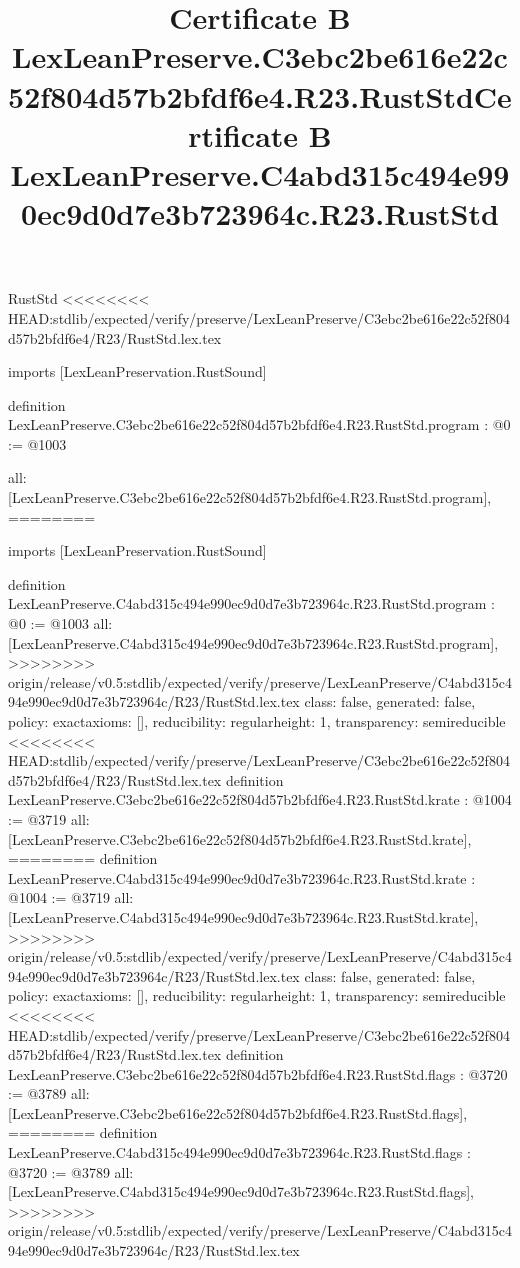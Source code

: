 \begin{lexlean}{RustStd}
<<<<<<<< HEAD:stdlib/expected/verify/preserve/LexLeanPreserve/C3ebc2be616e22c52f804d57b2bfdf6e4/R23/RustStd.lex.tex
\title{Certificate B LexLeanPreserve.C3ebc2be616e22c52f804d57b2bfdf6e4.R23.RustStd}
\begin{coremodule}
imports [LexLeanPreservation.RustSound]

definition LexLeanPreserve.C3ebc2be616e22c52f804d57b2bfdf6e4.R23.RustStd.program : @0 := @1003 {
  all: [LexLeanPreserve.C3ebc2be616e22c52f804d57b2bfdf6e4.R23.RustStd.program],
========
\title{Certificate B LexLeanPreserve.C4abd315c494e990ec9d0d7e3b723964c.R23.RustStd}
\begin{coremodule}
imports [LexLeanPreservation.RustSound]

definition LexLeanPreserve.C4abd315c494e990ec9d0d7e3b723964c.R23.RustStd.program : @0 := @1003 {
  all: [LexLeanPreserve.C4abd315c494e990ec9d0d7e3b723964c.R23.RustStd.program],
>>>>>>>> origin/release/v0.5:stdlib/expected/verify/preserve/LexLeanPreserve/C4abd315c494e990ec9d0d7e3b723964c/R23/RustStd.lex.tex
  class: false,
  generated: false,
  policy: exact{axioms: []},
  reducibility: regular{height: 1},
  transparency: semireducible
}
<<<<<<<< HEAD:stdlib/expected/verify/preserve/LexLeanPreserve/C3ebc2be616e22c52f804d57b2bfdf6e4/R23/RustStd.lex.tex
definition LexLeanPreserve.C3ebc2be616e22c52f804d57b2bfdf6e4.R23.RustStd.krate : @1004 := @3719 {
  all: [LexLeanPreserve.C3ebc2be616e22c52f804d57b2bfdf6e4.R23.RustStd.krate],
========
definition LexLeanPreserve.C4abd315c494e990ec9d0d7e3b723964c.R23.RustStd.krate : @1004 := @3719 {
  all: [LexLeanPreserve.C4abd315c494e990ec9d0d7e3b723964c.R23.RustStd.krate],
>>>>>>>> origin/release/v0.5:stdlib/expected/verify/preserve/LexLeanPreserve/C4abd315c494e990ec9d0d7e3b723964c/R23/RustStd.lex.tex
  class: false,
  generated: false,
  policy: exact{axioms: []},
  reducibility: regular{height: 1},
  transparency: semireducible
}
<<<<<<<< HEAD:stdlib/expected/verify/preserve/LexLeanPreserve/C3ebc2be616e22c52f804d57b2bfdf6e4/R23/RustStd.lex.tex
definition LexLeanPreserve.C3ebc2be616e22c52f804d57b2bfdf6e4.R23.RustStd.flags : @3720 := @3789 {
  all: [LexLeanPreserve.C3ebc2be616e22c52f804d57b2bfdf6e4.R23.RustStd.flags],
========
definition LexLeanPreserve.C4abd315c494e990ec9d0d7e3b723964c.R23.RustStd.flags : @3720 := @3789 {
  all: [LexLeanPreserve.C4abd315c494e990ec9d0d7e3b723964c.R23.RustStd.flags],
>>>>>>>> origin/release/v0.5:stdlib/expected/verify/preserve/LexLeanPreserve/C4abd315c494e990ec9d0d7e3b723964c/R23/RustStd.lex.tex
}}}
\end{coremodule}}
\end{coremodule}
\end{lexlean}
